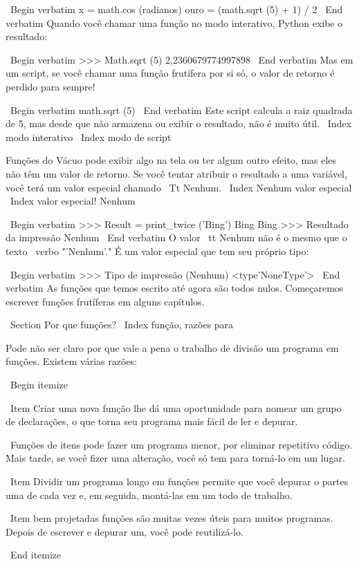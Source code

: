 \documentclass[10pt]{book}
\begin{document}
\begin {itemize}
{\ Begin {verbatim}
x = math.cos (radianos)
ouro = (math.sqrt (5) + 1) / 2
\ End {verbatim}
%
Quando você chamar uma função no modo interativo, Python exibe
o resultado:

\ Begin {verbatim}
>>> Math.sqrt (5)
2,2360679774997898
\ End {verbatim}
%
Mas em um script, se você chamar uma função frutífera por si só,
o valor de retorno é perdido para sempre!

\ Begin {verbatim}
math.sqrt (5)
\ End {verbatim}
%
Este script calcula a raiz quadrada de 5, mas desde que não armazena
ou exibir o resultado, não é muito útil.
\ Index {modo interativo}
\ Index {modo de script}

Funções do Vácuo pode exibir algo na tela ou ter algum
outro efeito, mas eles não têm um valor de retorno. Se você tentar
atribuir o resultado a uma variável, você terá um valor especial chamado
{\ Tt Nenhum}.
\ Index {Nenhum valor especial}
\ Index {valor especial! Nenhum}

\ Begin {verbatim}
>>> Result = print_twice ('Bing')
Bing
Bing
>>> Resultado da impressão
Nenhum
\ End {verbatim}
%
O valor {\ tt Nenhum} não é o mesmo que o texto \ verbo "'Nenhum'." 
É um valor especial que tem seu próprio tipo:

\ Begin {verbatim}
>>> Tipo de impressão (Nenhum)
<type'NoneType'>
\ End {verbatim}
%
As funções que temos escrito até agora são todos nulos. Começaremos
escrever funções frutíferas em alguns capítulos.


\ Section {Por que funções?}
\ Index {função, razões para}

Pode não ser claro por que vale a pena o trabalho de divisão
um programa em funções. Existem várias razões:

\ Begin {itemize}

\ Item Criar uma nova função lhe dá uma oportunidade para nomear um grupo
de declarações, o que torna seu programa mais fácil de ler e depurar.

\ Funções de itens pode fazer um programa menor, por eliminar repetitivo
código. Mais tarde, se você fizer uma alteração, você só tem
para torná-lo em um lugar.

\ Item Dividir um programa longo em funções permite que você depurar o
partes uma de cada vez e, em seguida, montá-las em um todo de trabalho.

\ Item bem projetadas funções são muitas vezes úteis para muitos programas.
Depois de escrever e depurar um, você pode reutilizá-lo.

\ End {itemize}


}
\end{itemize}
\end{document}
